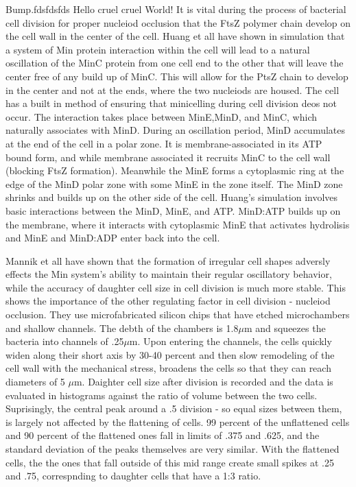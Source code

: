 \documentclass[pdftex,10pt,a4paper]{article}
\begin{document}


Bump.fdsfdsfds  Hello cruel cruel World!
It is vital during the process of bacterial cell division for proper nucleiod occlusion that the FtsZ polymer chain develop on the cell wall in the center of the cell.  Huang et all have shown in simulation that a system of Min protein interaction within the cell will lead to a natural oscillation of the MinC protein from one cell end to the other that will leave the center free of any build up of MinC.  This will allow for the PtsZ chain to develop in the center and not at the ends, where the two nucleiods are housed.  The cell has a built in method of ensuring that minicelling during cell division deos not occur.  The interaction takes place between MinE,MinD, and MinC, which naturally associates with MinD.  During an oscillation period, MinD accumulates at the end of the cell in a polar zone.  It is membrane-associated in its ATP bound form, and while membrane associated it recruits MinC to the cell wall (blocking FtsZ formation).  Meanwhile the MinE forms a cytoplasmic ring at the edge of the MinD polar zone with some MinE in the zone itself.  The MinD zone shrinks and builds up on the other side of the cell.  Huang's simulation involves basic interactions between the MinD, MinE, and ATP.  MinD:ATP builds up on the membrane, where it interacts with cytoplasmic MinE that activates hydrolisis and MinE and MinD:ADP enter back into the cell.

Mannik et all have shown that the formation of irregular cell shapes adversly effects the Min system's ability to maintain their regular oscillatory behavior, while the accuracy of daughter cell size in cell division is much more stable.  This shows the importance of the other regulating factor in cell division - nucleiod occlusion.  They use microfabricated silicon chips that have etched microchambers and shallow channels.  The debth of the chambers is 1.8$\mu$m and squeezes the bacteria into channels of .25$\mu$m.  Upon entering the channels, the cells quickly widen along their short axis by 30-40 percent and then slow remodeling of the cell wall with the mechanical stress, broadens the cells so that they can reach diameters of 5 $\mu$m.  Daighter cell size after division is recorded and the data is evaluated in histograms against the ratio of volume between the two cells.  Suprisingly, the central peak around a .5 division - so equal sizes between them, is largely not affected by the flattening of cells.  99 percent of the unflattened cells and 90 percent of the flattened ones fall in limits of .375 and .625, and the standard deviation of the peaks themselves are very similar.  With the flattened cells, the the ones that fall outside of this mid range create small spikes at .25 and .75, correspnding to daughter cells that have a 1:3 ratio.
\end{document}
